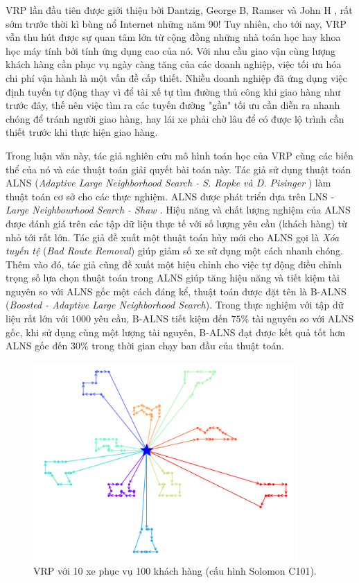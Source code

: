 VRP lần đầu tiên được giới thiệu bởi Dantzig, George B, Ramser và John H \cite{dantzig1959truck}, rất sớm trước thời kì bùng nổ Internet những năm 90! Tuy nhiên, cho tới nay, VRP vẫn thu hút được sự quan tâm lớn từ cộng đồng những nhà toán học hay khoa học máy tính bởi tính ứng dụng cao của nó. Với nhu cầu giao vận cùng lượng khách hàng cần phục vụ ngày càng tăng của các doanh nghiệp, việc tối ưu hóa chi phí vận hành là một vấn đề cấp thiết. Nhiều doanh nghiệp đã ứng dụng việc định tuyến tự động thay vì để tài xế tự tìm đường thủ công khi giao hàng như trước đây, thế nên việc tìm ra các tuyến đường "gần" tối ưu cần diễn ra nhanh chóng để tránh người giao hàng, hay lái xe phải chờ lâu để có được lộ trình cần thiết trước khi thực hiện giao hàng. 

Trong luận văn này, tác giả nghiên cứu mô hình toán học của VRP cùng các biến thể của nó và các thuật toán giải quyết bài toán này. Tác giả sử dụng thuật toán ALNS (\textit{Adaptive Large Neighborhood Search - S. Ropke và D. Pisinger} \cite{ropke2006adaptive}) làm thuật toán cơ sở cho các thực nghiệm. ALNS được phát triển dựa trên LNS - \textit{Large Neighbourhood Search - Shaw \cite{shaw1997new} \cite{shaw1998using}}. Hiệu năng và chất lượng nghiệm của ALNS được đánh giá trên các tập dữ liệu thực tế với số lượng yêu cầu (khách hàng) từ nhỏ tới rất lớn. Tác giả đề xuất một thuật toán hủy mới cho ALNS gọi là \textit{Xóa tuyến tệ} (\textit{Bad Route Removal}) giúp giảm số xe sử dụng một cách nhanh chóng. Thêm vào đó, tác giả cũng đề xuất một hiệu chỉnh cho việc tự động điều chỉnh trọng số lựa chọn thuật toán trong ALNS giúp tăng hiệu năng và tiết kiệm tài nguyên so với ALNS gốc một cách đáng kể, thuật toán được đặt tên là B-ALNS (\textit{Boosted - Adaptive Large Neighborhood Search}). Trong thực nghiệm với tập dữ liệu rất lớn với $1000$ yêu cầu, B-ALNS tiết kiệm đến $75\%$ tài nguyên so với ALNS gốc, khi sử dụng cùng một lượng tài nguyên, B-ALNS đạt được kết quả tốt hơn ALNS gốc đến $30\%$ trong thời gian chạy ban đầu của thuật toán.

\begin{figure}[H] %
  \centering %
  \includegraphics[width=0.9\textwidth]{figures/routes_c101.png} 
  \caption{VRP với 10 xe phục vụ 100 khách hàng (cấu hình Solomon C101).} 
\end{figure}

